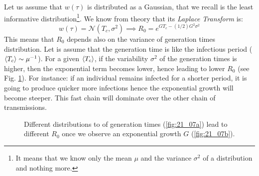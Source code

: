 \documentclass[../main/main.tex]{subfiles}
\begin{document}
Let us assume that $w(\tau)$ is distributed as a Gaussian, that we recall is the least informative distribution\footnote{It means that we know only the mean $\mu$ and the variance $\sigma^2$ of a distribution and nothing more.}. We know from theory that its \textit{Laplace Transform} is:
\begin{equation*}
    w(\tau) = \mathcal{N}(T_c, \sigma^2) \implies R_0 = e^{GT_c - (1/2)G^2\sigma^2}
\end{equation*}
This means that $R_0$ depends also on the variance of generation times distribution. Let is assume that the generation time is like the infectious period ($\expval{T_c} \sim \mu^{-1}$). For a given $\expval{T_c}$, if the variability  $\sigma^2$ of the generation times is higher, then the exponential term becomes lower, hence leading to lower $R_0$ (see Fig. \ref{fig:21_07}). For instance: if an individual remains infected for a shorter period, it is going to produce quicker more infections hence the exponential growth will become steeper. This fast chain will dominate over the other chain of transmissions.

\begin{figure}[h!]
\begin{minipage}[c]{0.5\linewidth}
\end{minipage}
\begin{minipage}[]{0.5\linewidth}
\centering
{}
\end{minipage}
\caption{\label{fig:21_07} Different distributions to of generation times (\ref{fig:21_07a}) lead to different $R_0$ once we observe an exponential growth $G$ (\ref{fig:21_07b}).}
\end{figure}
\end{document}
